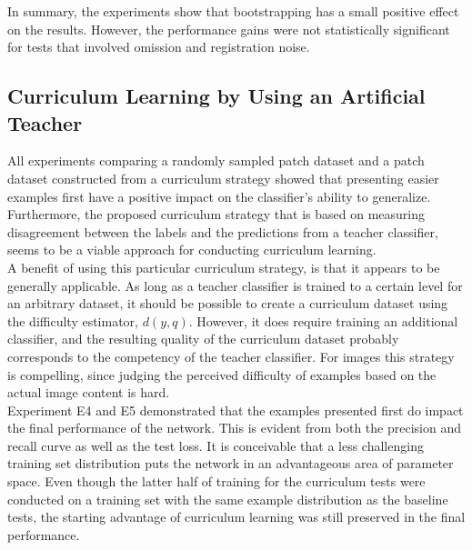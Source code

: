 In summary, the experiments show that bootstrapping has a small positive effect on the results. However, the performance gains were not statistically significant for tests that involved omission and registration noise.\\


\subsection{Curriculum Learning by Using an Artificial Teacher}

All experiments comparing a randomly sampled patch dataset and a patch dataset constructed from a curriculum strategy showed that presenting easier examples first have a positive impact on the classifier's ability to generalize. Furthermore, the proposed curriculum strategy that is based on measuring disagreement between the labels and the predictions from a teacher classifier, seems to be a viable approach for conducting curriculum learning.\\

A benefit of using this particular curriculum strategy, is that it appears to be generally applicable. As long as a teacher classifier is trained to a certain level for an arbitrary dataset, it should be possible to create a curriculum dataset using the difficulty estimator, $d(y,q)$. However, it does require training an additional classifier, and the resulting quality of the curriculum dataset probably corresponds to the competency of the teacher classifier. For images this strategy is compelling, since judging the perceived difficulty of examples based on the actual image content is hard.\\

Experiment E4 and E5 demonstrated that the examples presented first do impact the final performance of the network. This is evident from both the precision and recall curve as well as the test loss. It is conceivable that a less challenging training set distribution puts the network in an advantageous area of parameter space. Even though the latter half of training for the curriculum tests were conducted on a training set with the same example distribution as the baseline tests, the starting advantage of curriculum learning was still preserved in the final performance.  \\

